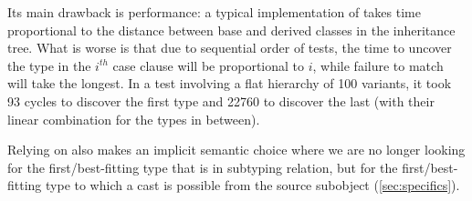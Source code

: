 \noindent
Its main drawback is performance: a typical implementation of 
 takes time proportional to the distance between base and 
derived classes in the inheritance tree. What is worse is that due to 
sequential order of tests, the time to uncover the type in the $i^{th}$ case 
clause will be proportional to $i$, while failure to match will take the longest. 
In a test involving a flat hierarchy of 100 variants, it took 93 cycles to 
discover the first type and 22760 to discover the last (with their linear combination 
for the types in between). %

Relying on  also makes an implicit semantic choice where we 
are no longer looking for the first/best-fitting type that is in subtyping 
relation, but for the first/best-fitting type to which a cast is possible from 
the source subobject (\textsection\ref{sec:specifics}).



